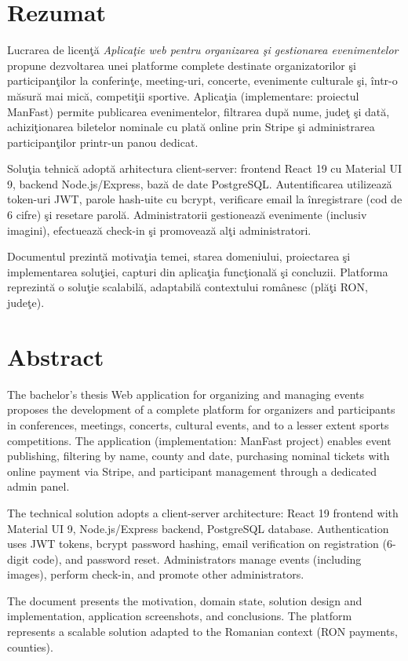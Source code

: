 \chapter*{Rezumat}

Lucrarea de licen\c t\u a \emph{Aplica\c tie web pentru organizarea \c si gestionarea evenimentelor} propune dezvoltarea unei platforme complete destinate organizatorilor \c si participan\c tilor la conferin\c te, meeting-uri, concerte, evenimente culturale \c si, \^intr-o m\u asur\u a mai mic\u a, competi\c tii sportive. Aplica\c tia (implementare: proiectul ManFast) permite publicarea evenimentelor, filtrarea dup\u a nume, jude\c t \c si dat\u a, achizi\c tionarea biletelor nominale cu plat\u a online prin Stripe \c si administrarea participan\c tilor printr-un panou dedicat.

Solu\c tia tehnic\u a adopt\u a arhitectura client-server: frontend React 19 cu Material UI 9, backend Node.js/Express, baz\u a de date PostgreSQL. Autentificarea utilizeaz\u a token-uri JWT, parole hash-uite cu bcrypt, verificare email la \^inregistrare (cod de 6 cifre) \c si resetare parol\u a. Administratorii gestioneaz\u a evenimente (inclusiv imagini), efectueaz\u a check-in \c si promoveaz\u a al\c ti administratori.

Documentul prezint\u a motiva\c tia temei, starea domeniului, proiectarea \c si implementarea solu\c tiei, capturi din aplica\c tia func\c tional\u a \c si concluzii. Platforma reprezint\u a o solu\c tie scalabil\u a, adaptabil\u a contextului rom\^anesc (pl\u a\c ti RON, jude\c te).

\vspace{1cm}
\chapter*{Abstract}

The bachelor's thesis Web application for organizing and managing events proposes the development of a complete platform for organizers and participants in conferences, meetings, concerts, cultural events, and to a lesser extent sports competitions. The application (implementation: ManFast project) enables event publishing, filtering by name, county and date, purchasing nominal tickets with online payment via Stripe, and participant management through a dedicated admin panel.

The technical solution adopts a client-server architecture: React 19 frontend with Material UI 9, Node.js/Express backend, PostgreSQL database. Authentication uses JWT tokens, bcrypt password hashing, email verification on registration (6-digit code), and password reset. Administrators manage events (including images), perform check-in, and promote other administrators.

The document presents the motivation, domain state, solution design and implementation, application screenshots, and conclusions. The platform represents a scalable solution adapted to the Romanian context (RON payments, counties).

\clearpage